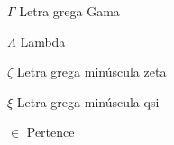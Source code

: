 
\begin{simbolos}
  \item[$ \Gamma $] Letra grega Gama
  \item[$ \Lambda $] Lambda
  \item[$ \zeta $] Letra grega minúscula zeta
  \item[$ \xi$] Letra grega minúscula qsi
  \item[$ \in $] Pertence
\end{simbolos}